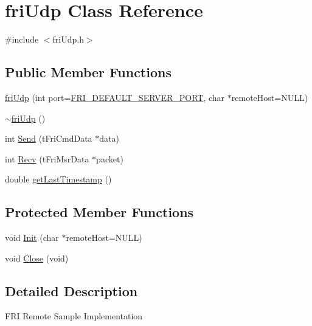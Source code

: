 \hypertarget{classfriUdp}{\section{fri\-Udp \-Class \-Reference}
\label{classfriUdp}
}


{\ttfamily \#include $<$fri\-Udp.\-h$>$}

\subsection*{\-Public \-Member \-Functions}
\begin{DoxyCompactItemize}
\item 
\hyperlink{group__friRemoteLib_ga730b349bec281584c0cf2ff34741a7a0}{fri\-Udp} (int port=\hyperlink{group__friRemoteLib_ga0060efa69492840494ae541296595f88}{\-F\-R\-I\-\_\-\-D\-E\-F\-A\-U\-L\-T\-\_\-\-S\-E\-R\-V\-E\-R\-\_\-\-P\-O\-R\-T}, char $\ast$remote\-Host=\-N\-U\-L\-L)
\item 
\hyperlink{group__friRemoteLib_gadc3ef770767626411dd3207015e01c1f}{$\sim$fri\-Udp} ()
\item 
int \hyperlink{group__friRemoteLib_ga86dc5a0eeb70bdaa8116b39750ac23c1}{\-Send} (t\-Fri\-Cmd\-Data $\ast$data)
\item 
int \hyperlink{group__friRemoteLib_ga08d15306afb96c11f8a54c8f4a5315c5}{\-Recv} (t\-Fri\-Msr\-Data $\ast$packet)
\item 
double \hyperlink{classfriUdp_aaceef0ed7e615d8887b1743dfd76e55d}{get\-Last\-Timestamp} ()
\end{DoxyCompactItemize}
\subsection*{\-Protected \-Member \-Functions}
\begin{DoxyCompactItemize}
\item 
void \hyperlink{group__friRemoteLib_gaf02c35701e09daf86e2e257272357f82}{\-Init} (char $\ast$remote\-Host=\-N\-U\-L\-L)
\item 
void \hyperlink{group__friRemoteLib_ga49fa7e8de03a414f12a7132e19b206d7}{\-Close} (void)
\end{DoxyCompactItemize}


\subsection{\-Detailed \-Description}
\-F\-R\-I \-Remote \-Sample \-Implementation

